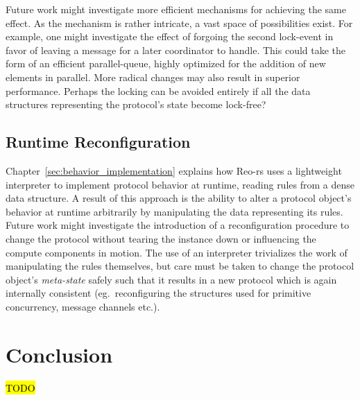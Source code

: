 Future work might investigate more efficient mechanisms for achieving the same effect. As the mechanism is rather intricate, a vast space of possibilities exist. For example, one might investigate the effect of forgoing the second lock-event in favor of leaving a message for a later coordinator to handle. This could take the form of an efficient parallel-queue, highly optimized for the addition of new elements in parallel. More radical changes may also result in superior performance. Perhaps the locking can be avoided entirely if all the data structures representing the protocol's state become lock-free?

\subsection{Runtime Reconfiguration}
Chapter~\ref{sec:behavior_implementation} explains how Reo-rs uses a lightweight interpreter to implement protocol behavior at runtime, reading rules from a dense data structure. A result of this approach is the ability to alter a protocol object's behavior at runtime arbitrarily by manipulating the data representing its rules. Future work might investigate the introduction of a reconfiguration procedure to change the protocol without tearing the instance down or influencing the compute components in motion. The use of an interpreter trivializes the work of manipulating the rules themselves, but care must be taken to change the protocol object's \textit{meta-state} safely such that it results in a new protocol which is again internally consistent (eg.\ reconfiguring the structures used for primitive concurrency, message channels etc.).

\section{Conclusion}
\hl{TODO}